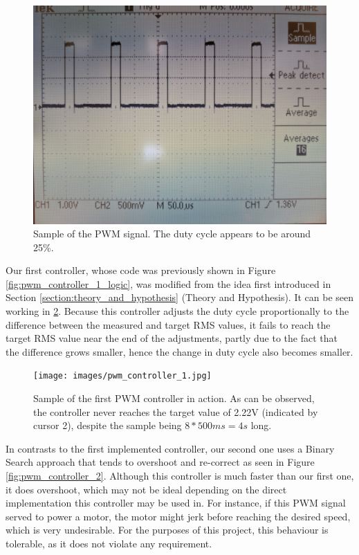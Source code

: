 \begin{figure}[h]
\centering
\includegraphics[scale=0.1]{images/pwm_duty_cycle.jpg}
\caption{\label{fig:PWM_duty_cycle} Sample of the PWM signal. The duty cycle appears to be around 25\%.}
\end{figure}


Our first controller, whose code was previously shown in Figure \ref{fig:pwm_controller_1_logic}, was modified from the idea first introduced in Section \ref{section:theory_and_hypothesis} (Theory and Hypothesis). It can be seen working in \ref{fig:pwm_controller_1}. Because this controller adjusts the duty cycle proportionally to the difference between the measured and target RMS values, it fails to reach the target RMS value near the end of the adjustments, partly due to the fact that the difference grows smaller, hence the change in duty cycle also becomes smaller.

\begin{figure}[h]
\texttt{[image: images/pwm\_controller\_1.jpg]}
\caption{\label{fig:pwm_controller_1} Sample of the first PWM controller in action. As can be observed, the controller never reaches the target value of 2.22V (indicated by cursor 2), despite the sample being $8 * 500ms = 4s$ long.}
\end{figure} \pagebreak



In contrasts to the first implemented controller, our second one uses a Binary Search approach that tends to overshoot and re-correct as seen in Figure \ref{fig:pwm_controller_2}. Although this controller is much faster than our first one, it does overshoot,  which may not be ideal depending on the direct implementation this controller may be used in. For instance, if this PWM signal served to power a motor, the motor might jerk before reaching the desired speed, which is very undesirable. For the purposes of this project, this behaviour is tolerable, as it does not violate any requirement.

